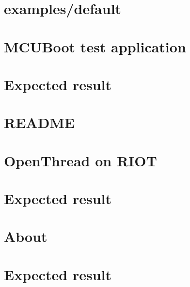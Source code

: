 \documentclass[twoside]{book}
\newcommand{\+}{\discretionary{\mbox{\scriptsize$\hookleftarrow$}}{}{}}
\begin{document}
\chapter{examples/default}
\label{md__home_ayush_RIOT_tests_lwmac_README}

\chapter{M\+C\+U\+Boot test application}
\label{md__home_ayush_RIOT_tests_mcuboot_README}

\chapter{Expected result}
\label{md__home_ayush_RIOT_tests_mutex_order_README}

\chapter{R\+E\+A\+D\+ME}
\label{md__home_ayush_RIOT_tests_netstats_l2_README}

\chapter{Open\+Thread on R\+I\+OT}
\label{md__home_ayush_RIOT_tests_openthread_README}

\chapter{Expected result}
\label{md__home_ayush_RIOT_tests_periph_adc_README}

\chapter{About}
\label{md__home_ayush_RIOT_tests_periph_dac_README}

\chapter{Expected result}
\label{md__home_ayush_RIOT_tests_periph_flashpage_README}

\end{document}
